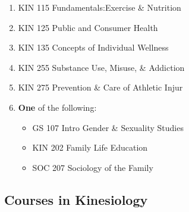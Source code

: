 \documentclass[
  letterpaper,
]{scrbook}
\providecommand{\tightlist}{%
  \setlength{\itemsep}{0pt}\setlength{\parskip}{0pt}}
\begin{document}
\begin{enumerate}
\def\labelenumi{\arabic{enumi}.}
\tightlist
\item
  KIN 115 Fundamentals:Exercise \& Nutrition\\
\item
  KIN 125 Public and Consumer Health\\
\item
  KIN 135 Concepts of Individual Wellness\\
\item
  KIN 255 Substance Use, Misuse, \& Addiction\\
\item
  KIN 275 Prevention \& Care of Athletic Injur\\
\item
  \textbf{One} of the following:

  \begin{itemize}
  \tightlist
  \item
    GS 107 Intro Gender \& Sexuality Studies\\
  \item
    KIN 202 Family Life Education\\
  \item
    SOC 207 Sociology of the Family
  \end{itemize}
\end{enumerate}

\subsection{Courses in Kinesiology}\label{courses-in-kinesiology}
\end{document}
